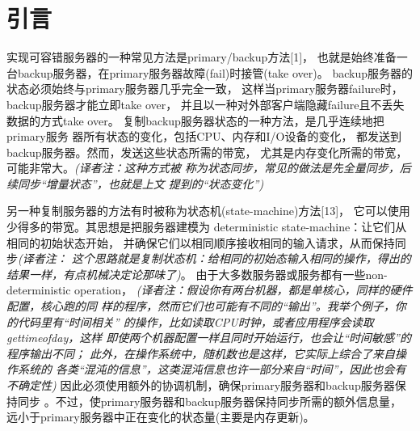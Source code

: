 \section{引言}

实现可容错服务器的一种常见方法是primary/backup方法[1]，%
也就是始终准备一台backup服务器，在primary服务器故障(fail)时接管(take over)。%
backup服务器的状态必须始终与primary服务器几乎完全一致，%
这样当primary服务器failure时，backup服务器才能立即take over，%
并且以一种对外部客户端隐藏failure且不丢失数据的方式take over。%
复制backup服务器状态的一种方法，是几乎连续地把primary服务%
器所有状态的变化，包括CPU、内存和I/O设备的变化，%
都发送到backup服务器。然而，发送这些状态所需的带宽，%
尤其是内存变化所需的带宽，可能非常大。\emph{(译者注：这种方式被%
称为状态同步，常见的做法是先全量同步，后续同步“增量状态”，也就是上文
提到的“状态变化”)}%

另一种复制服务器的方法有时被称为状态机(state-machine)方法[13]，%
它可以使用少得多的带宽。其思想是把服务器建模为%
deterministic state-machine：让它们从相同的初始状态开始，%
并确保它们以相同顺序接收相同的输入请求，从而保持同步\emph{(译者注：%
这个思路就是复制状态机：给相同的初始态输入相同的操作，得出的%
结果一样，有点机械决定论那味了)}。%
由于大多数服务器或服务都有一些non-deterministic operation，%
\emph{(译者注：假设你有两台机器，都是单核心，同样的硬件配置，核心跑的同%
样的程序，然而它们也可能有不同的“输出”。我举个例子，你的代码里有“时间相关”%
的操作，比如读取CPU时钟，或者应用程序会读取gettimeofday，这样%
即使两个机器配置一样且同时开始运行，也会让“时间敏感”的程序输出不同；%
此外，在操作系统中，随机数也是这样，它实际上综合了来自操作系统的%
各类“混沌的信息”，这类混沌信息也许一部分来自“时间”，因此也会有不确定性)}%
因此必须使用额外的协调机制，确保primary服务器和backup服务器保持同步%
。不过，使primary服务器和backup服务器保持同步所需的额外信息量，%
远小于primary服务器中正在变化的状态量(主要是内存更新)。%

